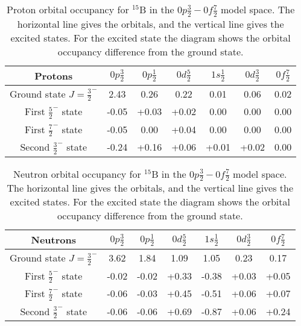 \begin{table}
\begin{center}
\begin{tabular}{|c|c|c|c|c|c|c|}
	\hline
	Protons & $0p\frac32$ & $0p\frac12$ & $0d\frac52$ & $1s\frac12$ & $0d\frac32$ & $0f\frac72$ \\
	\hline
	Ground state $J=\frac32^-$ & 2.43 & 0.26 & 0.22 & 0.01 & 0.06 & 0.02 \\
	\hline
	First $\frac52^-$ state & -0.05 & +0.03 & +0.02 & 0.00 & 0.00 & 0.00 \\
	\hline
	First $\frac72^-$ state & -0.05 & 0.00 & +0.04 & 0.00 & 0.00 & 0.00 \\
	\hline
	Second $\frac32^-$ state & -0.24 & +0.16 & +0.06 & +0.01 & +0.02 & 0.00 \\
	\hline
\end{tabular}
\caption{Proton orbital occupancy for $^{15}$B in the $0p\frac32-0f\frac72$ model space. The horizontal line gives the orbitals, and the vertical line gives the excited states. For the excited state the diagram shows the orbital occupancy difference from the ground state.}
\label{B15_0f7_p}
\end{center}
\end{table}

\begin{table}
\begin{center}
\begin{tabular}{|c|c|c|c|c|c|c|}
	\hline
	Neutrons & $0p\frac32$ & $0p\frac12$ & $0d\frac52$ & $1s\frac12$ & $0d\frac32$ & $0f\frac72$ \\
	\hline
	Ground state $J=\frac32^-$ & 3.62 & 1.84 & 1.09 & 1.05 & 0.23 & 0.17 \\
	\hline
	First $\frac52^-$ state & -0.02 & -0.02 & +0.33 & -0.38 & +0.03 & +0.05 \\
	\hline
	First $\frac72^-$ state & -0.06 & -0.03 & +0.45 & -0.51 & +0.06 & +0.07 \\
	\hline
	Second $\frac32^-$ state & -0.06 & -0.06 & +0.69 & -0.87 & +0.06 & +0.24 \\
	\hline
\end{tabular}
\caption{Neutron orbital occupancy for $^{15}$B in the $0p\frac32-0f\frac72$ model space. The horizontal line gives the orbitals, and the vertical line gives the excited states. For the excited state the diagram shows the orbital occupancy difference from the ground state.}
\label{B15_0f7_n}
\end{center}
\end{table}

\clearpage
